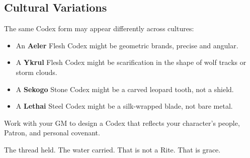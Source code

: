 \subsection*{Cultural Variations}

The same Codex form may appear differently across cultures:

\begin{itemize}
\item An \textbf{Aeler} Flesh Codex might be geometric brands, precise and angular.
\item A \textbf{Ykrul} Flesh Codex might be scarification in the shape of wolf tracks or storm clouds.
\item A \textbf{Sekogo} Stone Codex might be a carved leopard tooth, not a shield.
\item A \textbf{Lethai} Steel Codex might be a silk-wrapped blade, not bare metal.
\end{itemize}

Work with your GM to design a Codex that reflects your character's people, Patron, and personal covenant.

The thread held. The water carried. That is not a Rite. That is grace.
